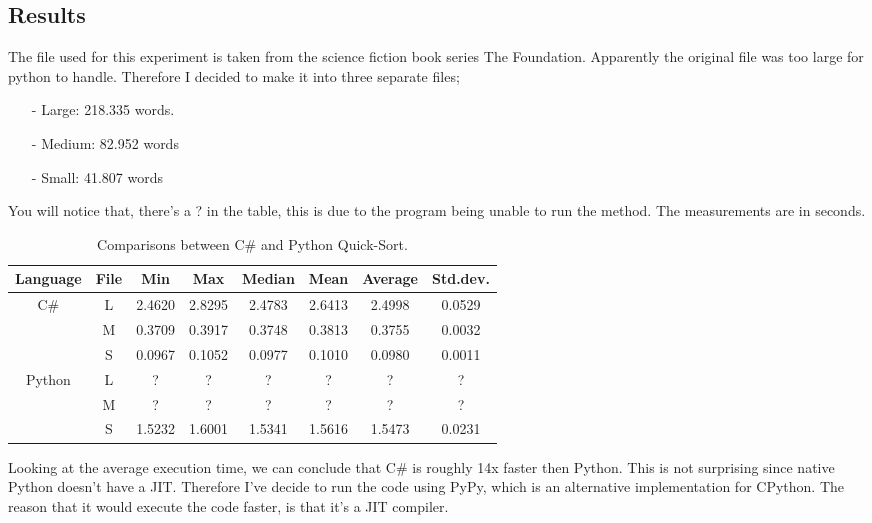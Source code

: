 \subsection{Results}
\label{sec:results}
The file used for this experiment is taken from the science fiction book series The Foundation. Apparently the original file was too large for python to handle. Therefore I decided to make it into three separate files; 

\begin{itemize}
  \item[-] Large: 218.335 words.
  \item[-] Medium: 82.952 words
  \item[-] Small: 41.807 words
\end{itemize}

\noindent You will notice that, there's a ? in the table, this is due to the program being unable to run the method. The measurements are in seconds.

\begin{table}[H]
\centering
\small
    \begin{tabular}{|c|c|c|c|c|c|c|c|} 
    \hline
        Language & File & Min & Max & Median & Mean & Average & Std.dev.\\
    \hline
        \multirow{3}{4em}{C\#} & L & 2.4620 & 2.8295 & 2.4783 & 2.6413 & 2.4998 & 0.0529 \\ 
        & M & 0.3709 & 0.3917 & 0.3748 & 0.3813 & 0.3755 & 0.0032 \\ 
        & S & 0.0967 & 0.1052 & 0.0977 & 0.1010 & 0.0980 & 0.0011 \\ 
    \hline
        \multirow{3}{4em}{Python} & L & ? & ? & ? & ? & ? & ? \\ 
        & M & ? & ? & ? & ? & ? & ? \\ 
        & S & 1.5232 & 1.6001 & 1.5341 & 1.5616 & 1.5473 & 0.0231 \\
    \hline
\end{tabular}
\vspace*{-0.3cm}
\caption{\label{tab:table-comparison}Comparisons between C\# and Python Quick-Sort.}
\end{table}

\noindent Looking at the average execution time, we can conclude that C\# is roughly 14x faster then Python. This is not surprising since native Python doesn't have a JIT\cite{tp_py_slow}. Therefore I've decide to run the code using PyPy, which is an alternative implementation for CPython. The reason that it would execute the code faster, is that it's a JIT compiler.

